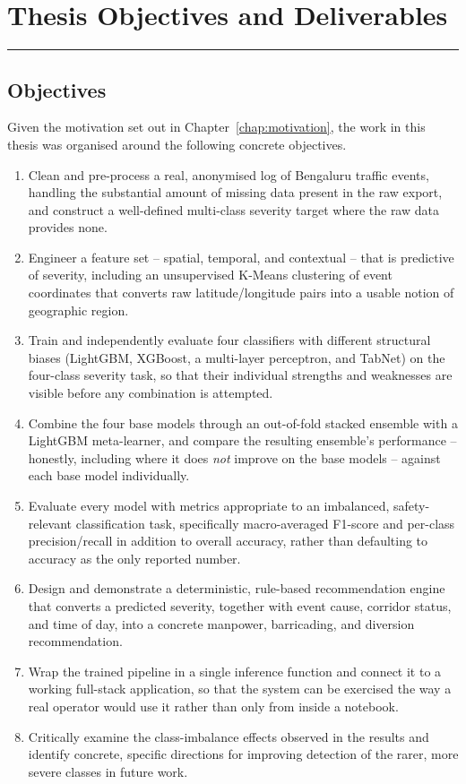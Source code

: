 \chapter{Thesis Objectives and Deliverables}
\label{chap:objectives}
\noindent \rule{6.6in}{0.01in}
\newpage

\section{Objectives}

Given the motivation set out in Chapter~\ref{chap:motivation}, the work in this thesis was organised around the following concrete objectives.

\begin{enumerate}
\item Clean and pre-process a real, anonymised log of Bengaluru traffic events, handling the substantial amount of missing data present in the raw export, and construct a well-defined multi-class severity target where the raw data provides none.
\item Engineer a feature set -- spatial, temporal, and contextual -- that is predictive of severity, including an unsupervised K-Means clustering of event coordinates that converts raw latitude/longitude pairs into a usable notion of geographic region.
\item Train and independently evaluate four classifiers with different structural biases (LightGBM, XGBoost, a multi-layer perceptron, and TabNet) on the four-class severity task, so that their individual strengths and weaknesses are visible before any combination is attempted.
\item Combine the four base models through an out-of-fold stacked ensemble with a LightGBM meta-learner, and compare the resulting ensemble's performance -- honestly, including where it does \emph{not} improve on the base models -- against each base model individually.
\item Evaluate every model with metrics appropriate to an imbalanced, safety-relevant classification task, specifically macro-averaged F1-score and per-class precision/recall in addition to overall accuracy, rather than defaulting to accuracy as the only reported number.
\item Design and demonstrate a deterministic, rule-based recommendation engine that converts a predicted severity, together with event cause, corridor status, and time of day, into a concrete manpower, barricading, and diversion recommendation.
\item Wrap the trained pipeline in a single inference function and connect it to a working full-stack application, so that the system can be exercised the way a real operator would use it rather than only from inside a notebook.
\item Critically examine the class-imbalance effects observed in the results and identify concrete, specific directions for improving detection of the rarer, more severe classes in future work.
\end{enumerate}

